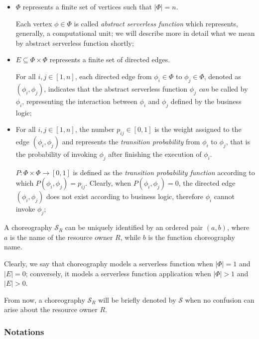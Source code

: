 \begin{itemize}
	\item $\Phi$ represents a finite set of vertices such that $|\Phi|=n$. 
	
	Each vertex $\phi \in \Phi$ is called \textit{abstract serverless function} which represents, generally, a computational unit; we will describe more in detail what we mean by abstract serverless function shortly;
	
	\item $E \subseteq \Phi \times \Phi $ represents a finite set of directed edges.
	
	For all $i,j \in \left[ 1, n \right]$, each directed edge from $\phi_i \in \Phi$ to $\phi_j \in \Phi$, denoted as $\left( \phi_i, \phi_j \right)$, indicates that the abstract serverless function $\phi_j$ \textit{can} be called by $\phi_i$, representing the interaction between $\phi_i$ and $\phi_j$ defined by the business logic;
	
	\item For all $i,j \in \left[ 1, n \right]$, the number $p_{ij} \in \left[ 0, 1 \right]$ is the weight assigned to the edge $\left(\phi_i, \phi_j \right)$ and represents the \textit{transition probability} from $\phi_i$ to $\phi_j$, that is the probability of invoking $\phi_j$ after finishing the execution of $\phi_i$.
	
	$P : \Phi \times \Phi \to \left[ 0, 1 \right]$ is defined as the \textit{transition probability function} according to which $P\left(\phi_i, \phi_j \right) = p_{ij}$. Clearly, when $P\left(\phi_i, \phi_j \right) = 0$, the directed edge $\left( \phi_i, \phi_j \right)$ does not exist according to business logic, therefore $\phi_i$ cannot invoke $\phi_j$;
	
\end{itemize} 

A choreography $\mathcal{S}_R$ can be uniquely identified by an ordered pair $(a, b)$, where $a$ is the name of the resource owner $R$, while $b$ is the function choreography name.

Clearly, we say that choreography models a serverless function when $|\Phi| = 1$ and $|E| = 0$; conversely, it models a serverless function application when $|\Phi| > 1$ and $|E| > 0$.

From now, a choreography $\mathcal{S}_R$ will be briefly denoted by $\mathcal{S}$ when no confusion can arise about the resource owner $R$.

\subsubsection{Notations}

